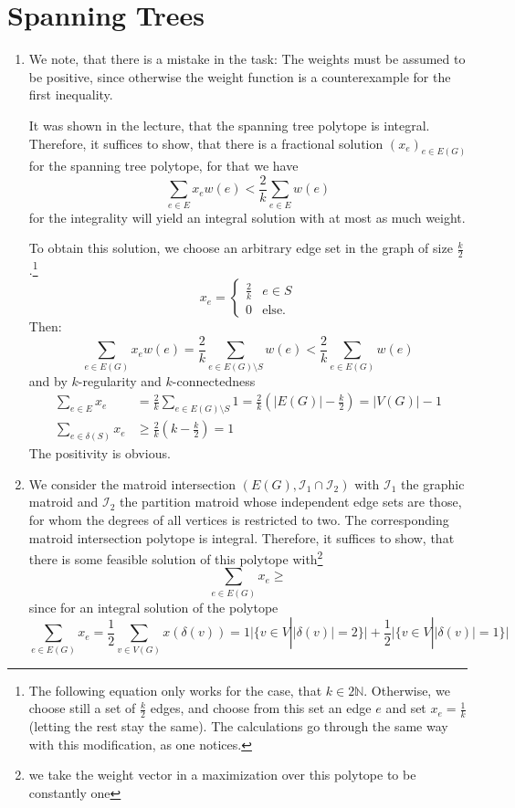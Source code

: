 \documentclass{scrartcl}
\newcommand\1{\mathbf{1}}
\begin{document}
\section{Spanning Trees}
\begin{enumerate}
\item
We note, that there is a mistake in the task: The weights must be assumed to be positive, since otherwise the weight function is a counterexample for the first inequality.

It was shown in the lecture, that the spanning tree polytope is integral. Therefore, it suffices to show, that there is a fractional solution $(x_e)_{e \in E(G)}$ for the spanning tree polytope, for that we have
\[
\sum_{e \in E} x_e w(e) < \frac{2}{k} \sum_{e \in E} w(e)
\]
for the integrality will yield an integral solution with at most as much weight. 

To obtain this solution, we choose an arbitrary edge set in the graph of size $\frac{k}{2}$.\footnote{The following equation only works for the case, that $k\in 2\mathbb{N}$. Otherwise, we choose still a set of $\frac{k}{2}$ edges, and choose from this set an edge $e$ and set $x_e = \frac{1}{k}$ (letting the rest stay the same). The calculations go through the same way with this modification, as one notices.}
\[
x_e = \begin{cases} \frac{2}{k} & e \in S \\ 0 &\text{else.}\end{cases}
\]
Then:
\[
\sum_{e \in E(G)} x_e w(e) = \frac{2}{k}\sum_{e \in E(G) \setminus S} w(e) <  \frac{2}{k}\sum_{e \in E(G)} w(e)
\]
and by $k$-regularity and $k$-connectedness
\begin{align*}
\sum_{e \in E} x_e &= \frac{2}{k}\sum_{e \in E(G) \setminus S} 1 =\frac{2}{k}( \lvert E(G) \rvert - \frac{k}{2}) = \lvert V(G) \rvert -1\\
\sum_{e \in \delta (S)} x_e &\ge \frac{2}{k} (k-\frac{k}{2}) = 1
\end{align*}
The positivity is obvious.
\item
We consider the matroid intersection $(E(G), \mathcal{I}_1\cap \mathcal{I}_2)$ with $\mathcal{I}_1$ the graphic matroid and $\mathcal{I}_2$ the partition matroid whose independent edge sets are those, for whom the degrees of all vertices is restricted to two. The corresponding matroid intersection polytope is integral. Therefore, it suffices to show, that there is some feasible solution of this polytope with\footnote{we take the weight vector in a maximization over this polytope to be constantly one}
\[
\sum_{e \in E(G)} x_e  \ge 
\]
since for an integral solution of the polytope
\[
\sum_{e \in E(G)} x_e = \frac{1}{2} \sum_{v \in V(G)} x(\delta(v)) = 1 \lvert\{v \in V| \lvert\delta (v)\rvert=2\}\rvert + \frac{1}{2} \lvert\{v \in V| \lvert\delta (v)\rvert=1\}\rvert
\]
\end{enumerate}
\end{document}
